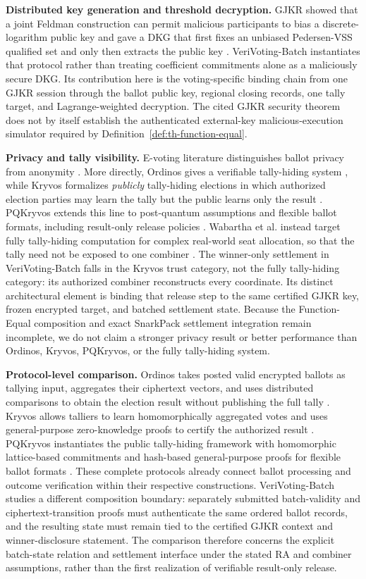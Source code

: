 \documentclass[pdflatex,sn-mathphys-num]{sn-jnl}%
\theoremstyle{thmstyleone}%
\theoremstyle{thmstyletwo}%
\theoremstyle{thmstylethree}%
\begin{document}
\textbf{Distributed key generation and threshold decryption.} GJKR showed that a joint Feldman construction can permit malicious participants to bias a discrete-logarithm public key and gave a DKG that first fixes an unbiased Pedersen-VSS qualified set and only then extracts the public key \cite{bib133}. VeriVoting-Batch instantiates that protocol rather than treating coefficient commitments alone as a maliciously secure DKG. Its contribution here is the voting-specific binding chain from one GJKR session through the ballot public key, regional closing records, one tally target, and Lagrange-weighted decryption. The cited GJKR security theorem does not by itself establish the authenticated external-key malicious-execution simulator required by Definition~\ref{def:th-function-equal}.

\textbf{Privacy and tally visibility.} E-voting literature distinguishes
ballot privacy from anonymity \cite{bib83}.  More directly, Ordinos gives a
verifiable tally-hiding system \cite{bib76}, while Kryvos formalizes
\emph{publicly} tally-hiding elections in which authorized election parties
may learn the tally but the public learns only the result \cite{bib77}.
PQKryvos extends this line to post-quantum assumptions and flexible ballot
formats, including result-only release policies \cite{bib139}.
Wabartha et al. instead target fully tally-hiding computation for complex
real-world seat allocation, so that the tally need not be exposed to one
combiner \cite{bib136}.  The winner-only settlement in VeriVoting-Batch falls in the
Kryvos trust category, not the fully tally-hiding category: its authorized
combiner reconstructs every coordinate.  Its distinct architectural element
is binding that release step to the same certified GJKR key, frozen encrypted
target, and batched settlement state.  Because the Function-Equal composition
and exact SnarkPack settlement integration remain incomplete, we do not claim a stronger privacy result or
better performance than Ordinos, Kryvos, PQKryvos, or the fully tally-hiding
system.

\textbf{Protocol-level comparison.}
Ordinos takes posted valid encrypted ballots as tallying input, aggregates
their ciphertext vectors, and uses distributed comparisons to obtain the
election result without publishing the full tally \cite{bib76}.
Kryvos allows talliers to learn homomorphically aggregated votes and uses
general-purpose zero-knowledge proofs to certify the authorized result
\cite{bib77}.  PQKryvos instantiates the public tally-hiding framework with
homomorphic lattice-based commitments and hash-based general-purpose proofs
for flexible ballot formats \cite{bib139}.  These complete protocols already
connect ballot processing and outcome verification within their respective
constructions.  VeriVoting-Batch studies a different composition boundary:
separately submitted batch-validity and ciphertext-transition proofs must
authenticate the same ordered ballot records, and the resulting state must
remain tied to the certified GJKR context and winner-disclosure statement.
The comparison therefore concerns the explicit batch-state relation and
settlement interface under the stated RA and combiner assumptions, rather
than the first realization of verifiable result-only release.
\end{document}
